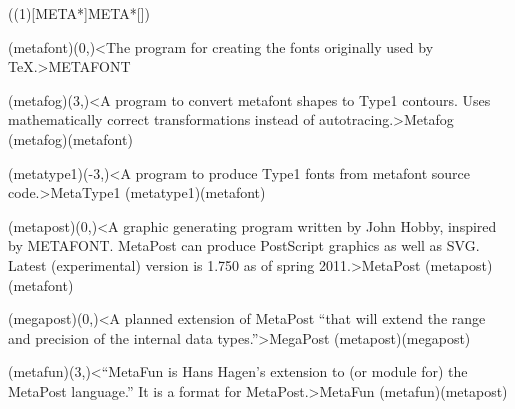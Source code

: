 \tograph(\tostruct(1)[META*]{META*}[\program]){
	\tonode(metafont)(0,\layer)<The program for creating the fonts originally used by TeX.>{METAFONT}
	\steplayer

	\tonode(metafog)(3,\layer)<A program to convert metafont shapes to Type1 contours. Uses mathematically correct transformations instead of autotracing.>{Metafog}
	\todraw(metafog)(metafont)

	\tonode(metatype1)(-3,\layer)<A program to produce Type1 fonts from metafont source code.>{MetaType1}
	\todraw(metatype1)(metafont)

	\tonode(metapost)(0,\layer)<A graphic generating program written by John Hobby, inspired by METAFONT. MetaPost can produce PostScript graphics as well as SVG. Latest (experimental) version is 1.750 as of spring 2011.>{MetaPost}
	\todraw(metapost)(metafont)
	\steplayer[-3]

	\tonode[\experimental](megapost)(0,\layer)<A planned extension of MetaPost “that will extend the range
and precision of the internal data types.”>{MegaPost}
	\todraw(metapost)(megapost)

	\tonode[\normalimportant]%
			(metafun)(3,\layer)<“MetaFun is Hans Hagen's extension to (or module for) the MetaPost language.” It is a format for MetaPost.>{MetaFun}
	\todraw(metafun)(metapost)
}

